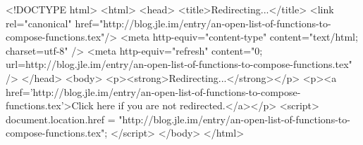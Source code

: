 <!DOCTYPE html>
<html>
<head>
<title>Redirecting...</title>
<link rel="canonical" href="http://blog.jle.im/entry/an-open-list-of-functions-to-compose-functions.tex"/>
<meta http-equiv="content-type" content="text/html; charset=utf-8" />
<meta http-equiv="refresh" content="0; url=http://blog.jle.im/entry/an-open-list-of-functions-to-compose-functions.tex" />
</head>
<body>
  <p><strong>Redirecting...</strong></p>
  <p><a href='http://blog.jle.im/entry/an-open-list-of-functions-to-compose-functions.tex'>Click here if you are not redirected.</a></p>
  <script>
    document.location.href = "http://blog.jle.im/entry/an-open-list-of-functions-to-compose-functions.tex";
  </script>
</body>
</html>
